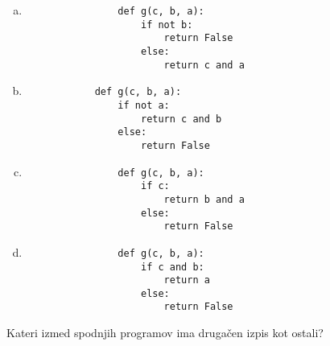 \documentclass[arhiv, 10pt]{../izpit}
\begin{document}
        \begin{multicols}{2}
        \begin{enumerate}[(a)]
\item 
                \begin{verbatim}
                def g(c, b, a):
                    if not b:
                        return False
                    else:
                        return c and a
                \end{verbatim}
            
\item 
            \begin{verbatim}
            def g(c, b, a):
                if not a:
                    return c and b
                else:
                    return False
            \end{verbatim}
        
\item 
                \begin{verbatim}
                def g(c, b, a):
                    if c:
                        return b and a
                    else:
                        return False
                \end{verbatim}
            
\item 
                \begin{verbatim}
                def g(c, b, a):
                    if c and b:
                        return a
                    else:
                        return False
                \end{verbatim}
            
\end{enumerate}

        \end{multicols}
    
        \naloga*
        
        Kateri izmed spodnjih programov ima drugačen izpis kot ostali?
    
\end{document}
